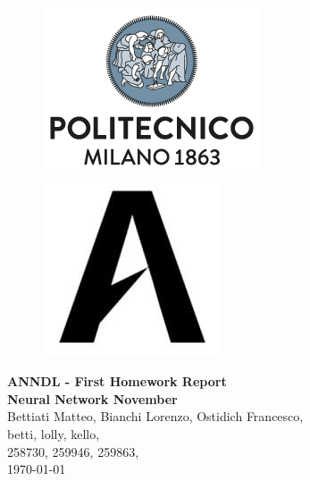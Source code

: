\documentclass[11pt]{article}
\begin{document}
    
    \begin{figure}[H]
        \raggedright
        \includegraphics[scale=0.4]{polimi.png} \hfill \includegraphics[scale=0.3]{airlab.jpeg}
    \end{figure}
    
    \vspace{5mm}
    
    \begin{center}
        {\Large \textbf{ANNDL - First Homework Report}}\\
        \vspace{2mm}
        {\Large \textbf{Neural Network November}}\\
        \vspace{2mm}
        {\large Bettiati Matteo,}
        {\large Bianchi Lorenzo,}
        {\large Ostidich Francesco,}\\
        \vspace{2mm}
        {betti,}
        {lolly,}
        {kello,}\\
        \vspace{2mm}
        {258730,}
        {259946,}
        {259863,}\\
        \vspace{5mm}
        \today
    \end{center}    
    \vspace{5mm}
\end{document}
